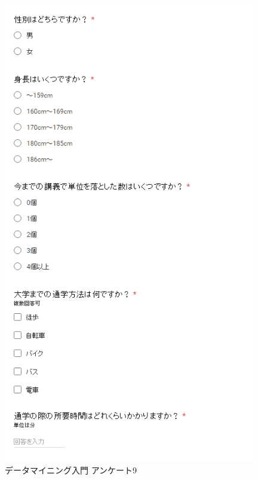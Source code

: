 \begin{figure}[p]
\centering
\includegraphics[width=11cm]{forms9.PNG}
\caption{データマイニング入門 アンケート9}\label{サンプル図}
\end{figure}

